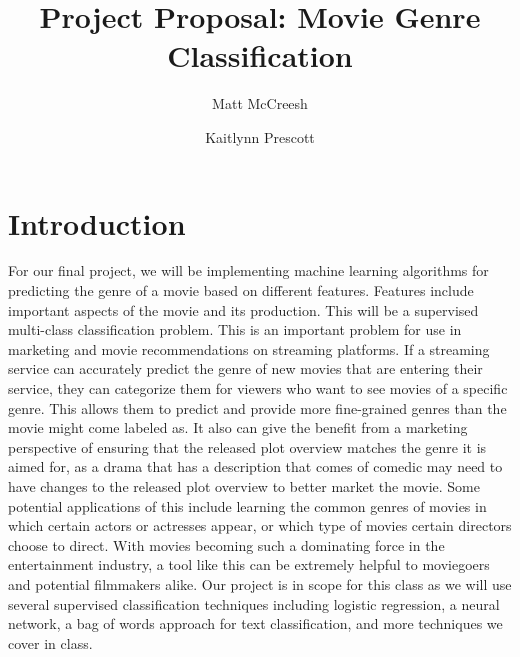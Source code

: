 \documentclass[sigconf]{acmart}
\begin{document}
%
\title{Project Proposal: Movie Genre Classification}

%
\author{Matt McCreesh}
\affiliation{%
}

\author{Kaitlynn Prescott}
\affiliation{%
}

\renewcommand{\shortauthors}{Trovato and Tobin, et al.}
\linebreak\linebreak
%

%
\maketitle

\section{Introduction}

For our final project, we will be implementing machine learning algorithms for predicting the genre of a movie based on different features.  Features include important aspects of the movie and its production. This will be a supervised multi-class classification problem. 
This is an important problem for use in marketing and movie recommendations on streaming platforms. If a streaming service can accurately predict the genre of new movies that are entering their service, they can categorize them for viewers who want to see movies of a specific genre. This allows them to predict and provide more fine-grained genres than the movie might come labeled as. It also can give the benefit from a marketing perspective of ensuring that the released plot overview matches the genre it is aimed for, as a drama that has a description that comes of comedic may need to have changes to the released plot overview to better market the movie. 
Some potential applications of this include learning the common genres of movies in which certain actors or actresses appear, or which type of movies certain directors choose to direct. With movies becoming such a dominating force in the entertainment industry, a tool like this can be extremely helpful to moviegoers and potential filmmakers alike. 
Our project is in scope for this class as we will use several supervised classification techniques including logistic regression, a neural network, a bag of words approach for text classification, and more techniques we cover in class. 
\end{document}
